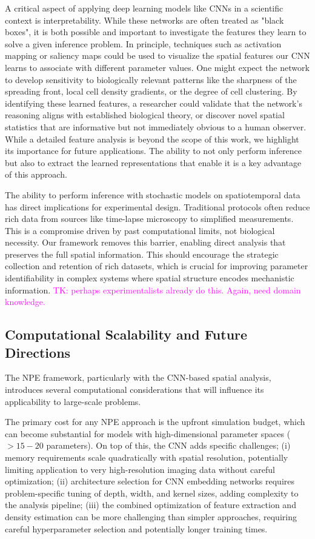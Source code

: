 \documentclass{article}
\begin{document}
A critical aspect of applying deep learning models like CNNs in a scientific context is interpretability. While these networks are often treated as "black boxes", it is both possible and important to investigate the features they learn to solve a given inference problem. In principle, techniques such as activation mapping \cite{2023arXiv230914304M} or saliency maps \citep{2019arXiv191111293M} could be used to visualize the spatial features our CNN learns to associate with different parameter values.  One might expect the network to develop sensitivity to biologically relevant patterns like the sharpness of the spreading front, local cell density gradients, or the degree of cell clustering. By identifying these learned features, a researcher could validate that the network's reasoning aligns with established biological theory, or discover novel spatial statistics that are informative but not immediately obvious to a human observer. While a detailed feature analysis is beyond the scope of this work, we highlight its importance for future applications. The ability to not only perform inference but also to extract the learned representations that enable it is a key advantage of this approach. 

The ability to perform inference with stochastic models on spatiotemporal data has direct implications for experimental design. Traditional protocols often reduce rich data from sources like time-lapse microscopy to simplified measurements. This is a compromise driven by past computational limits, not biological necessity. Our framework removes this barrier, enabling direct analysis that preserves the full spatial information. This should encourage the strategic collection and retention of rich datasets, which is crucial for improving parameter identifiability in complex systems where spatial structure encodes mechanistic information. \textcolor{magenta}{TK: perhaps experimentalists already do this. Again, need domain knowledge.}




\subsection{Computational Scalability and Future Directions}
The NPE framework, particularly with the CNN-based spatial analysis, introduces several computational considerations that will influence its applicability to large-scale problems.

The primary cost for any NPE approach is the upfront simulation budget, which can become substantial for models with high-dimensional parameter spaces ($> 15-20$ parameters). On top of this, the CNN adds specific challenges; (i) memory requirements scale quadratically with spatial resolution, potentially limiting application to very high-resolution imaging data without careful optimization; (ii) architecture selection for CNN embedding networks requires problem-specific tuning of depth, width, and kernel sizes, adding complexity to the analysis pipeline; (iii) the combined optimization of feature extraction and density estimation can be more challenging than simpler approaches, requiring careful hyperparameter selection and potentially longer training times.
\end{document}

